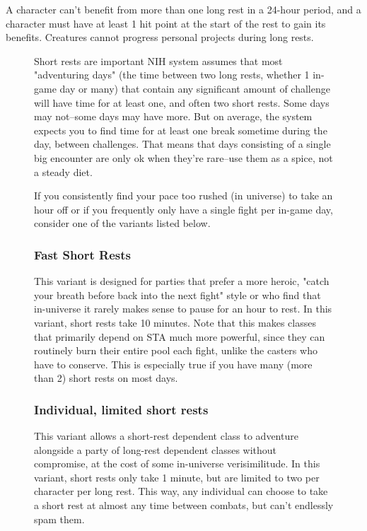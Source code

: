 A character can't benefit from more than one long rest in a 24-hour period, and a character must have at least 1 hit point at the start of the rest to gain its benefits. Creatures cannot progress personal projects during long rests.

\begin{figure}
    \begin{DndSidebar}{Short rests are important}
        NIH system assumes that most "adventuring days" (the time between two long rests, whether 1 in-game day or many) that contain any significant amount of challenge will have time for at least one, and often two short rests. Some days may not--some days may have more. But on average, the system expects you to find time for at least one break sometime during the day, between challenges. That means that days consisting of a single big encounter are only ok when they're rare--use them as a spice, not a steady diet.

        If you consistently find your pace too rushed (in universe) to take an hour off or if you frequently only have a single fight per in-game day, consider one of the variants listed below.
        \subsubsection{Fast Short Rests}

        This variant is designed for parties that prefer a more heroic, "catch your breath before back into the next fight" style or who find that in-universe it rarely makes sense to pause for an hour to rest. In this variant, short rests take 10 minutes. Note that this makes classes that primarily depend on STA much more powerful, since they can routinely burn their entire pool each fight, unlike the casters who have to conserve. This is especially true if you have many (more than 2) short rests on most days.

        \subsubsection{Individual, limited short rests}
        This variant allows a short-rest dependent class to adventure alongside a party of long-rest dependent classes without compromise, at the cost of some in-universe verisimilitude. In this variant, short rests only take 1 minute, but are limited to two per character per long rest. This way, any individual can choose to take a short rest at almost any time between combats, but can't endlessly spam them.


\end{DndSidebar}
\end{figure}
